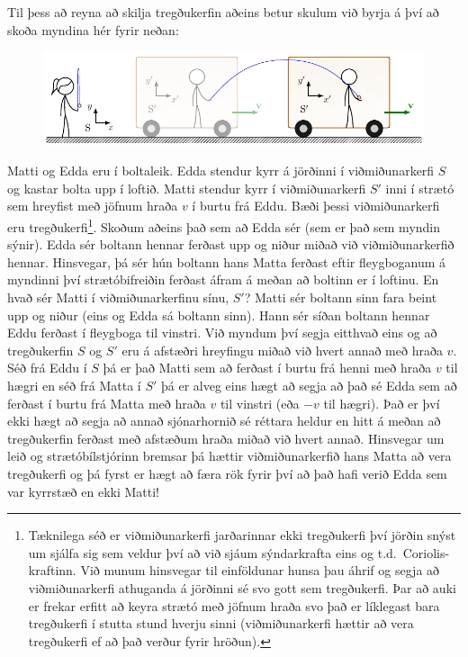 \ifdefined \wholebook \else\documentclass[oneside]{book}\usepackage{EdlBook}\graphicspath{{figures/}}
\begin{document}
Til þess að reyna að skilja tregðukerfin aðeins betur skulum við byrja á því að skoða myndina hér fyrir neðan:

\begin{figure}[H]
    \centering
    \includegraphics[width=.85\textwidth]{figures/tregdukerfi.pdf}
\end{figure}

Matti og Edda eru í boltaleik. Edda stendur kyrr á jörðinni í viðmiðunarkerfi $S$ og kastar bolta upp í loftið. Matti stendur kyrr í viðmiðunarkerfi $S'$ inni í strætó sem hreyfist með jöfnum hraða $v$ í burtu frá Eddu. Bæði þessi viðmiðunarkerfi eru tregðukerfi\footnote{Tæknilega séð er viðmiðunarkerfi jarðarinnar ekki tregðukerfi því jörðin snýst um sjálfa sig sem veldur því að við sjáum sýndarkrafta eins og t.d.~Coriolis-kraftinn. Við munum hinsvegar til einföldunar hunsa þau áhrif og segja að viðmiðunarkerfi athuganda á jörðinni sé svo gott sem tregðukerfi. Þar að auki er frekar erfitt að keyra strætó með jöfnum hraða svo það er líklegast bara tregðukerfi í stutta stund hverju sinni (viðmiðunarkerfi hættir að vera tregðukerfi ef að það verður fyrir hröðun).}. Skoðum aðeins það sem að Edda sér (sem er það sem myndin sýnir). Edda sér boltann hennar ferðast upp og niður miðað við viðmiðunarkerfið hennar. Hinsvegar, þá sér hún boltann hans Matta ferðast eftir fleygboganum á myndinni því strætóbifreiðin ferðast áfram á meðan að boltinn er í loftinu. En hvað sér Matti í viðmiðunarkerfinu sínu, $S'$? Matti sér boltann sinn fara beint upp og niður (eins og Edda sá boltann sinn). Hann sér síðan boltann hennar Eddu ferðast í fleygboga til vinstri. Við myndum því segja eitthvað eins og að tregðukerfin $S$ og $S'$ eru á afstæðri hreyfingu miðað við hvert annað með hraða $v$. Séð frá Eddu í $S$ þá er það Matti sem að ferðast í burtu frá henni með hraða $v$ til hægri en séð frá Matta í $S'$ þá er alveg eins hægt að segja að það sé Edda sem að ferðast í burtu frá Matta með hraða $v$ til vinstri (eða $-v$ til hægri). Það er því ekki hægt að segja að annað sjónarhornið sé réttara heldur en hitt á meðan að tregðukerfin ferðast með afstæðum hraða miðað við hvert annað. Hinsvegar um leið og strætóbílstjórinn bremsar þá hættir viðmiðunarkerfið hans Matta að vera tregðukerfi og þá fyrst er hægt að færa rök fyrir því að það hafi verið Edda sem var kyrrstæð en ekki Matti! \\
\end{document}
